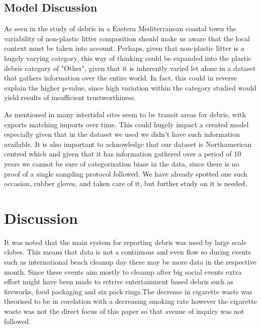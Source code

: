 \documentclass[10pt]{article}\usepackage[]{graphicx}\usepackage[]{color}
\begin{document}
\subsection{Model Discussion}

As seen in the study of debris in a Eastern Mediterranean coastal town \cite{PORTMAN2017} the variability of non-plastic litter composition should make us aware that the local context must be taken into account. Perhaps, given that non-plastic litter is a hugely varying category, this way of thinking could be expanded into the plastic debris category of "Other", given that it is inherently varied let alone in a dataset that gathers information over the entire world. In fact, this could in reverse explain the higher p-value, since high variation within the category studied would yield results of insufficient trustworthiness. 

As mentioned in \cite{BROWNE2015} many intertidal sites seem to be transit areas for debris, with exports matching imports over time. This could hugely impact a created model especially given that in the dataset we used we didn't have such information available. It is also important to acknowledge that our dataset is Northamerican centred which and given that it has information gathered over a period of 10 years we cannot be sure of categorization biase in the data, since there is no proof of a single sampling protocol followed. We have already spotted one such occasion, rubber gloves, and taken care of it, but further study on it is needed. 


\pagebreak
\section{Discussion}

It was noted that the main system for reporting debris was used by large scale clobes. This means that data is not a continuous and even flow so during events such as international beach cleanup day there may be more data in the respective month. Since these events aim mostly to cleanup after big social events extra effort might have been made to retrive entertainment based debris such as fireworks, food packaging and six pack rings.The decrease in cigarette waste was theorised to be in corelation with a decreasing smoking rate however the cigarette waste was not the direct focus of this paper so that avenue of inquiry was not followed.
\end{document}
